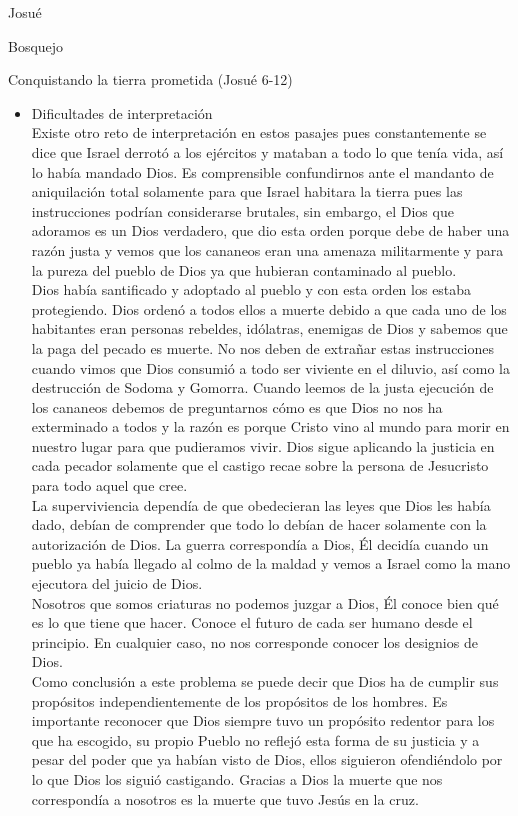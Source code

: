 \begin{section}{Josué}
\begin{subsection}{Bosquejo}
\begin{subsubsection}{Conquistando la tierra prometida (Josué 6-12)}
\begin{enumerate}
				\begin{itemize}
					\item Dificultades de interpretación\\
				Existe otro reto de interpretación en estos pasajes pues constantemente se dice que Israel derrotó a los ejércitos y mataban a todo lo que tenía vida, así lo había mandado Dios. Es comprensible confundirnos ante el mandanto de aniquilación total solamente para que Israel habitara la tierra pues las instrucciones podrían considerarse brutales, sin embargo, el Dios que adoramos es un Dios verdadero,  que dio esta orden porque debe de haber una razón justa y vemos que los cananeos eran una amenaza militarmente y para la pureza del pueblo de Dios ya que hubieran contaminado al pueblo. \\
				Dios había santificado y adoptado al pueblo y con esta orden los estaba protegiendo. Dios ordenó a todos ellos a muerte debido a que cada uno de los habitantes eran personas rebeldes, idólatras, enemigas de Dios y sabemos que la paga del pecado es muerte. No nos deben de extrañar estas instrucciones cuando vimos que Dios consumió a todo ser viviente en el diluvio, así como la destrucción de Sodoma y Gomorra. \newpage
				Cuando leemos de la justa ejecución de los cananeos debemos de preguntarnos cómo es que Dios no nos ha exterminado a todos y la razón es porque Cristo vino al mundo para morir en nuestro lugar para que pudieramos vivir. Dios sigue aplicando la justicia en cada pecador solamente que el castigo recae sobre la persona de Jesucristo para todo aquel que cree.\\
				La superviviencia dependía de que obedecieran las leyes que Dios les había dado, debían de comprender que todo lo debían de hacer solamente con la autorización de Dios. La guerra correspondía a Dios, Él decidía cuando un pueblo ya había llegado al colmo de la maldad y vemos a Israel como la mano ejecutora del juicio de Dios.\\
				Nosotros que somos criaturas no podemos juzgar a Dios, Él conoce bien qué es lo que tiene que hacer. Conoce el futuro de cada ser humano desde el principio. En cualquier caso, no nos corresponde conocer los designios de Dios.\\
Como conclusión a este problema se puede decir que Dios ha de cumplir sus propósitos independientemente de los propósitos de los hombres. Es importante reconocer que Dios siempre tuvo un propósito redentor para los que ha escogido, su propio Pueblo no reflejó esta forma de su justicia y a pesar del poder que ya habían visto de Dios, ellos siguieron ofendiéndolo por lo que Dios los siguió castigando. Gracias a Dios la muerte que nos correspondía a nosotros es la muerte que tuvo Jesús en la cruz. \\

\end{itemize}
\end{enumerate}
\end{subsubsection}
\end{subsection}
\end{section}
